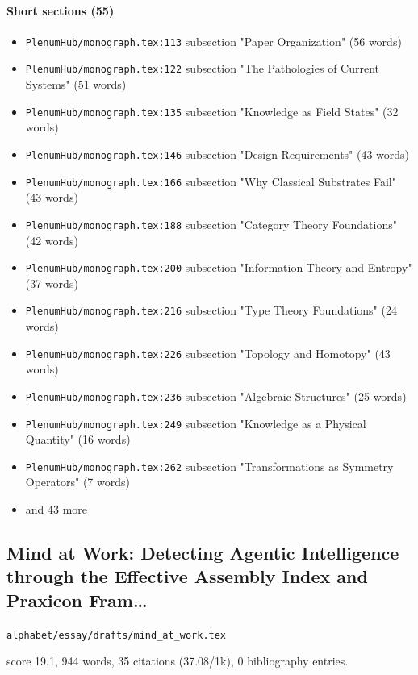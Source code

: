 \documentclass[11pt]{article}
\newcommand{\loc}[1]{{\small\color{muted}\texttt{#1}}}
\begin{document}
\paragraph{Short sections (55)}
\begin{itemize}
\item \loc{PlenumHub/\allowbreak{}monograph.tex:113} subsection "Paper Organization" (56 words)
\item \loc{PlenumHub/\allowbreak{}monograph.tex:122} subsection "The Pathologies of Current Systems" (51 words)
\item \loc{PlenumHub/\allowbreak{}monograph.tex:135} subsection "Knowledge as Field States" (32 words)
\item \loc{PlenumHub/\allowbreak{}monograph.tex:146} subsection "Design Requirements" (43 words)
\item \loc{PlenumHub/\allowbreak{}monograph.tex:166} subsection "Why Classical Substrates Fail" (43 words)
\item \loc{PlenumHub/\allowbreak{}monograph.tex:188} subsection "Category Theory Foundations" (42 words)
\item \loc{PlenumHub/\allowbreak{}monograph.tex:200} subsection "Information Theory and Entropy" (37 words)
\item \loc{PlenumHub/\allowbreak{}monograph.tex:216} subsection "Type Theory Foundations" (24 words)
\item \loc{PlenumHub/\allowbreak{}monograph.tex:226} subsection "Topology and Homotopy" (43 words)
\item \loc{PlenumHub/\allowbreak{}monograph.tex:236} subsection "Algebraic Structures" (25 words)
\item \loc{PlenumHub/\allowbreak{}monograph.tex:249} subsection "Knowledge as a Physical Quantity" (16 words)
\item \loc{PlenumHub/\allowbreak{}monograph.tex:262} subsection "Transformations as Symmetry Operators" (7 words)
\item[] {\color{muted}\small and 43 more}
\end{itemize}
\subsection{Mind at Work: Detecting Agentic Intelligence through the Effective Assembly Index and Praxicon Fram\ldots{}}
\loc{alphabet/\allowbreak{}essay/\allowbreak{}drafts/\allowbreak{}mind\_at\_work.tex}\par
score 19.1, 944 words, 35 citations (37.08/1k), 0 bibliography entries.
\end{document}
